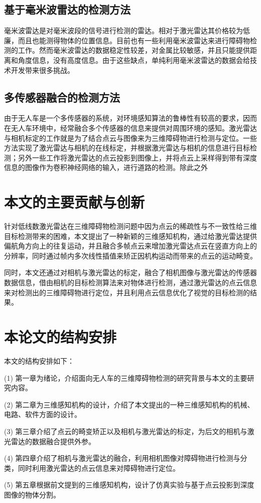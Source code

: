 \subsection{基于毫米波雷达的检测方法}

毫米波雷达是对毫米波段的信号进行检测的雷达。相对于激光雷达其价格较为低廉，而且也能测得物体的位置信息。目前也有一些利用毫米波雷达来进行障碍物检测的工作。然而毫米波雷达的数据稳定性较差，对金属比较敏感，并且只能提供距离和角度信息，没有高度信息。由于这些缺点，单纯利用毫米波雷达的数据会给技术开发带来很多挑战。

\subsection{多传感器融合的检测方法}

由于无人车是一个多传感器的系统，对环境感知算法的鲁棒性有较高的要求，因而在无人车环境中，经常融合多个传感器的信息来提供对周围环境的感知。激光雷达与相机标定的工作就是为了结合点云与图像来为三维障碍物进行检测与定位。一些方法实现了激光雷达与相机的在线标定，并根据激光雷达与相机的信息进行目标检测；另外一些工作将激光雷达的点云投影到图像上，并将点云上采样得到带有深度信息的图像作为卷积神经网络的输入，进行道路的检测。除此之外

\section{本文的主要贡献与创新}
针对低线数激光雷达在三维障碍物检测问题中因为点云的稀疏性与不一致性给三维目标检测带来的困难，本文提出了一种新颖的三维感知机构，通过给激光雷达提供偏航角方向上的往复运动，并且融合多帧点云来增加激光雷达点云在竖直方向上的分辨率，同时通过帧内多次线性插值来矫正因机构运动而带来的点云的运动畸变。

同时，本文还通过对相机与激光雷达的标定，融合了相机图像与激光雷达的传感器数据信息，借由相机的目标检测算法来对物体进行检测，通过激光雷达的点云信息来对检测出的三维障碍物进行定位，并且利用点云信息优化了视觉的目标检测的结果。

\section{本论文的结构安排}
本文的结构安排如下：

(1) 第一章为绪论，介绍面向无人车的三维障碍物检测的研究背景与本文的主要研究内容。

(2) 第二章为三维感知机构的设计，介绍了本文提出的一种三维感知机构的机械、电路、软件方面的设计。

(3) 第三章介绍了点云的畸变矫正以及相机与激光雷达的标定，为后文的相机与激光雷达的数据融合提供外参。

(4) 第四章介绍了相机与激光雷达的融合，利用相机图像对障碍物进行检测与分类，同时利用激光雷达的点云信息来对障碍物进行定位。

(5) 第五章根据前文提到的三维感知机构，设计了仿真实验与基于点云投影到深度图像的物体分割。
